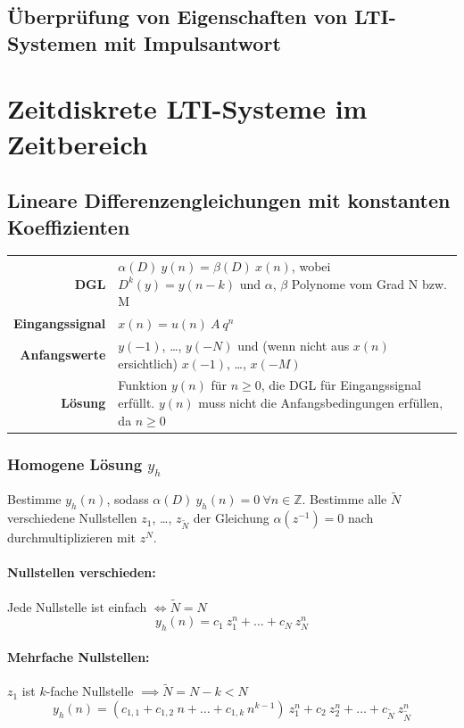 \documentclass[10pt,a4paper]{article}
\newcommand{\fancythumb}[2]{
	\addthumb{#1}{\large\sffamily\textbf{\space\space#1\vspace{5pt}}}{white}{#2}
}
\begin{document}
\subsection*{Überprüfung von Eigenschaften von LTI-Systemen mit Impulsantwort}
\newpage


\section*{Zeitdiskrete LTI-Systeme im Zeitbereich}
\fancythumb{ZD-t}{magenta}
\subsection*{Lineare Differenzengleichungen mit konstanten Koeffizienten}
\begin{tabular}{r p{12cm}}
	\textbf{DGL} & $\alpha(D) ~ y(n) = \beta(D) ~ x(n)$, wobei $D^k(y) = y(n-k)$ und $\alpha$, $\beta$ Polynome vom Grad N bzw. M \\
	\textbf{Eingangssignal} & $x(n) = u(n) ~ A ~ q^n$ \\
	\textbf{Anfangswerte} & $y(-1)$, …, $y(-N)$ und (wenn nicht aus $x(n)$ ersichtlich) $x(-1)$, …, $x(-M)$ \\
	\textbf{Lösung} & Funktion $y(n)$ für $n \geq 0$, die DGL für Eingangssignal erfüllt. $y(n)$ muss nicht die Anfangsbedingungen erfüllen, da $n \geq 0$
\end{tabular}

\subsubsection*{Homogene Lösung $y_h$}
Bestimme $y_h(n)$, sodass $\alpha(D) ~ y_h(n) = 0 ~ \forall n \in \mathbb Z$. Bestimme alle $\tilde N$ verschiedene Nullstellen $z_1$, …, $z_{\tilde N}$ der Gleichung $\alpha(z^{-1}) = 0$ nach durchmultiplizieren mit $z^N$.

\paragraph{Nullstellen verschieden:} Jede Nullstelle ist einfach $\Leftrightarrow \tilde N = N$
\[
	y_h(n) = c_1 ~ z_1^n + … + c_N ~ z_N^n
\]

\paragraph{Mehrfache Nullstellen:} $z_1$ ist $k$-fache Nullstelle $\implies \tilde N = N - k < N$
\[
	y_h(n) = \left(c_{1,1} + c_{1,2} ~ n + … + c_{1,k} ~ n^{k-1}\right) ~ z_1^n + c_2 ~ z_2^n + … + c_{\tilde N} ~ z_{\tilde N}^n
\]
\end{document}
